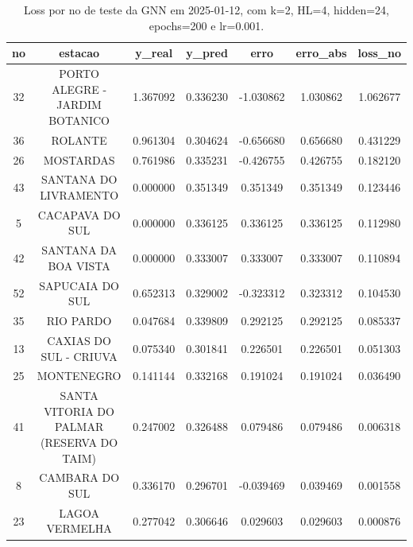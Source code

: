 \begin{table}[h]
\centering
\caption{Loss por no de teste da GNN em 2025-01-12, com k=2, HL=4, hidden=24, epochs=200 e lr=0.001.}
\label{tab:gnn_loss_k2_hl4_h24_e200_d20250112}
\begin{tabular}{ccccccc}
\toprule
no & estacao & y\_real & y\_pred & erro & erro\_abs & loss\_no \\
\midrule
32 & PORTO ALEGRE - JARDIM BOTANICO & 1.367092 & 0.336230 & -1.030862 & 1.030862 & 1.062677 \\
36 & ROLANTE & 0.961304 & 0.304624 & -0.656680 & 0.656680 & 0.431229 \\
26 & MOSTARDAS & 0.761986 & 0.335231 & -0.426755 & 0.426755 & 0.182120 \\
43 & SANTANA DO LIVRAMENTO & 0.000000 & 0.351349 & 0.351349 & 0.351349 & 0.123446 \\
5 & CACAPAVA DO SUL & 0.000000 & 0.336125 & 0.336125 & 0.336125 & 0.112980 \\
42 & SANTANA DA BOA VISTA & 0.000000 & 0.333007 & 0.333007 & 0.333007 & 0.110894 \\
52 & SAPUCAIA DO SUL & 0.652313 & 0.329002 & -0.323312 & 0.323312 & 0.104530 \\
35 & RIO PARDO & 0.047684 & 0.339809 & 0.292125 & 0.292125 & 0.085337 \\
13 & CAXIAS DO SUL - CRIUVA & 0.075340 & 0.301841 & 0.226501 & 0.226501 & 0.051303 \\
25 & MONTENEGRO & 0.141144 & 0.332168 & 0.191024 & 0.191024 & 0.036490 \\
41 & SANTA VITORIA DO PALMAR (RESERVA DO TAIM) & 0.247002 & 0.326488 & 0.079486 & 0.079486 & 0.006318 \\
8 & CAMBARA DO SUL & 0.336170 & 0.296701 & -0.039469 & 0.039469 & 0.001558 \\
23 & LAGOA VERMELHA & 0.277042 & 0.306646 & 0.029603 & 0.029603 & 0.000876 \\
\bottomrule
\end{tabular}
\end{table}
